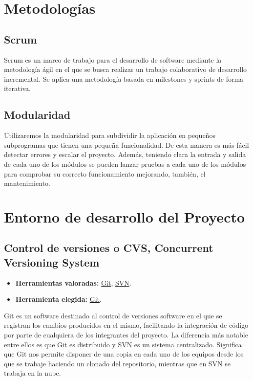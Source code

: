 \section{Metodologías}
\subsection{Scrum}\label{4:SCRUM}
Scrum\cite{manual:Scrum} es un marco de trabajo para el desarrollo de software mediante la metodología ágil en el que se busca realizar un trabajo colaborativo de desarrollo incremental. Se aplica una metodología basada en milestones y sprints de forma iterativa.

\subsection{Modularidad}\label{4:Modularidad}
Utilizaremos la modularidad para subdividir la aplicación en pequeños subprogramas que tienen una pequeña funcionalidad. De esta manera es más fácil detectar errores y escalar el proyecto. Además, teniendo clara la entrada y salida de cada uno de los módulos se pueden lanzar pruebas a cada uno de los módulos para comprobar su correcto funcionamiento mejorando, también, el mantenimiento.

\section{Entorno de desarrollo del Proyecto}

\subsection{Control de versiones o CVS, Concurrent Versioning System}\label{4:controlVersiones}
\begin{itemize}
    \item \textbf{Herramientas valoradas:} \href{https://git-scm.com/}{Git}, \href{https://subversion.apache.org/}{SVN}.
    \item \textbf{Herramienta elegida:} \href{https://git-scm.com/}{Git}.
\end{itemize}

Git es un software destinado al control de versiones software en el que se registran los cambios producidos en el mismo, facilitando la integración de código por parte de cualquiera de los integrantes del proyecto.
La diferencia más notable entre ellos es que Git es distribuido y SVN es un sistema centralizado. Significa que Git nos permite disponer de una copia en cada uno de los equipos desde los que se trabaje haciendo un clonado del repositorio, mientras que en SVN se trabaja en la nube.

